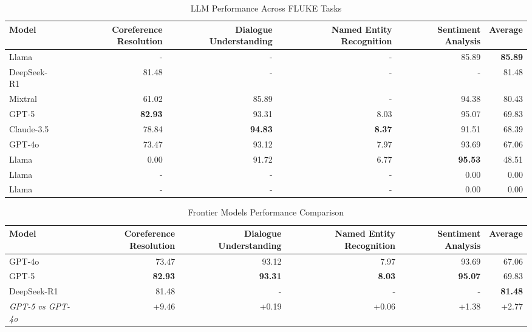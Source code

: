 
\begin{table}[htbp]
\centering
\caption{LLM Performance Across FLUKE Tasks}
\label{tab:cross_task_comparison}
\begin{tabular}{lrrrrr}
\toprule
Model & Coreference Resolution & Dialogue Understanding & Named Entity Recognition & Sentiment Analysis & Average \\
\midrule
Llama & - & - & - & 85.89 & \textbf{85.89} \\
DeepSeek-R1 & 81.48 & - & - & - & 81.48 \\
Mixtral & 61.02 & 85.89 & - & 94.38 & 80.43 \\
GPT-5 & \textbf{82.93} & 93.31 & 8.03 & 95.07 & 69.83 \\
Claude-3.5 & 78.84 & \textbf{94.83} & \textbf{8.37} & 91.51 & 68.39 \\
GPT-4o & 73.47 & 93.12 & 7.97 & 93.69 & 67.06 \\
Llama & 0.00 & 91.72 & 6.77 & \textbf{95.53} & 48.51 \\
Llama & - & - & - & 0.00 & 0.00 \\
Llama & - & - & - & 0.00 & 0.00 \\
\bottomrule
\end{tabular}
\end{table}

\begin{table}[htbp]
\centering
\caption{Frontier Models Performance Comparison}
\label{tab:frontier_models}
\begin{tabular}{lrrrrr}
\toprule
Model & Coreference Resolution & Dialogue Understanding & Named Entity Recognition & Sentiment Analysis & Average \\
\midrule
GPT-4o & 73.47 & 93.12 & 7.97 & 93.69 & 67.06 \\
GPT-5 & \textbf{82.93} & \textbf{93.31} & \textbf{8.03} & \textbf{95.07} & 69.83 \\
DeepSeek-R1 & 81.48 & - & - & - & \textbf{81.48} \\
\midrule
\textit{GPT-5 vs GPT-4o} & +9.46 & +0.19 & +0.06 & +1.38 & +2.77 \\
\bottomrule
\end{tabular}
\end{table}


